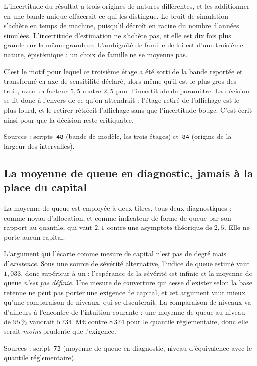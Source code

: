\documentclass[12pt,a4paper]{article}
\theoremstyle{definition}
\begin{document}
L'incertitude du résultat a trois origines de natures différentes, et les
additionner en une bande unique effacerait ce qui les distingue. Le bruit de
simulation s'achète en temps de machine, puisqu'il décroît en racine du nombre
d'années simulées. L'incertitude d'estimation ne s'achète pas, et elle est dix fois
plus grande sur la même grandeur. L'ambiguïté de famille de loi est d'une troisième
nature, épistémique : un choix de famille ne se moyenne pas.

C'est le motif pour lequel ce troisième étage a été sorti de la bande reportée et
transformé en axe de sensibilité déclaré, alors même qu'il est le plus gros des
trois, avec un facteur $5{,}5$ contre $2{,}5$ pour l'incertitude de paramètre. La
décision se lit donc à l'envers de ce qu'on attendrait : l'étage retiré de
l'affichage est le plus lourd, et le retirer rétrécit l'affichage sans que
l'incertitude bouge. C'est écrit ainsi pour que la décision reste critiquable.

\vspace{4pt}
\noindent Sources : scripts~\texttt{48} (bande de modèle, les trois étages)
et~\texttt{84} (origine de la largeur des intervalles).

\subsection*{La moyenne de queue en diagnostic, jamais à la place du capital}

La moyenne de queue est employée à deux titres, tous deux diagnostiques : comme
noyau d'allocation, et comme indicateur de forme de queue par son rapport au
quantile, qui vaut $2{,}1$ contre une asymptote théorique de $2{,}5$. Elle ne porte
aucun capital.

L'argument qui l'écarte comme mesure de capital n'est pas de degré mais
d'\emph{existence}. Sous une source de sévérité alternative, l'indice de queue
estimé vaut $1{,}033$, donc supérieur à un : l'espérance de la sévérité est infinie
et la moyenne de queue \emph{n'est pas définie}. Une mesure de couverture qui cesse
d'exister selon la base retenue ne peut pas porter une exigence de capital, et cet
argument vaut mieux qu'une comparaison de niveaux, qui se discuterait. La
comparaison de niveaux va d'ailleurs à l'encontre de l'intuition courante : une
moyenne de queue au niveau de $95\,\%$ vaudrait $5\,734$~M\euro{} contre $8\,374$
pour le quantile réglementaire, donc elle serait \emph{moins} prudente que
l'exigence.

\vspace{4pt}
\noindent Sources : script~\texttt{73} (moyenne de queue en diagnostic, niveau
d'équivalence avec le quantile réglementaire).
\end{document}
